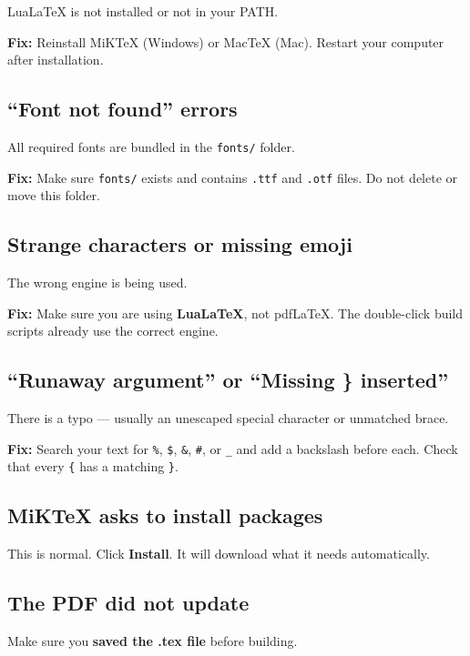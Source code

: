 \documentclass[a4paper,11pt]{article}
\begin{document}
LuaLaTeX is not installed or not in your PATH.

\textbf{Fix:} Reinstall MiKTeX (Windows) or MacTeX (Mac). Restart your computer after installation.

\subsection{``Font not found'' errors}

All required fonts are bundled in the \texttt{fonts/} folder.

\textbf{Fix:} Make sure \texttt{fonts/} exists and contains \texttt{.ttf} and \texttt{.otf} files. Do not delete or move this folder.

\subsection{Strange characters or missing emoji}

The wrong engine is being used.

\textbf{Fix:} Make sure you are using \textbf{LuaLaTeX}, not pdfLaTeX. The double-click build scripts already use the correct engine.

\subsection{``Runaway argument'' or ``Missing \} inserted''}

There is a typo --- usually an unescaped special character or unmatched brace.

\textbf{Fix:} Search your text for \texttt{\%}, \texttt{\$}, \texttt{\&}, \texttt{\#}, or \texttt{\_} and add a backslash before each. Check that every \texttt{\{} has a matching \texttt{\}}.

\subsection{MiKTeX asks to install packages}

This is normal. Click \textbf{Install}. It will download what it needs automatically.

\subsection{The PDF did not update}

Make sure you \textbf{saved the .tex file} before building.

\end{document}
